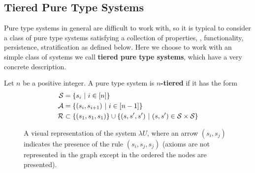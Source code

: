 \documentclass{article}
\begin{document}
\subsection{Tiered Pure Type Systems}

Pure type systems in general are difficult to work with, so it is typical to consider a class of pure type systems satisfying a collection of properties, \eg, functionality, persistence, stratification as defined below.
Here we choose to work with an simple class of systems we call \textbf{tiered pure type systems}, which have a very concrete description.

\begin{definition}
Let $n$ be a positive integer.
A pure type system is \textbf{$n$-tiered} if it has the form
\begin{align*}
    \mathcal S &= \{s_i \ | \ i \in [n]\} \\
    \mathcal A &= \{(s_i, s_{i + 1}) \ | \ i \in [n - 1]\} \\
    \mathcal R &\subset \{(s_1, s_1, s_1)\} \cup \{(s, s', s') \ | \ (s, s') \in \mathcal S \times \mathcal S\}
\end{align*}
\end{definition}

\begin{figure}
\centering
\caption{A visual representation of the system $\lambda U$, where an arrow $(s_i, s_j)$ indicates the presence of the rule $(s_i, s_j, s_j)$ (axioms are not represented in the graph except in the ordered the nodes are presented).}
\label{fig:tiered}
\end{figure}
\end{document}
